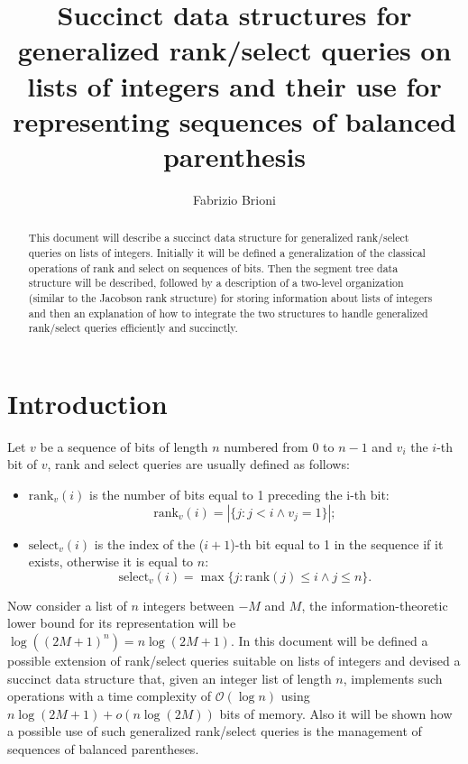 \documentclass{article}
\title{Succinct data structures for generalized rank/select queries on lists of integers and their use for representing sequences of balanced parenthesis}
\author{Fabrizio Brioni}
\begin{document}
\maketitle

\begin{abstract}
This document will describe a succinct data structure for generalized rank/select queries on lists of integers. Initially it will be defined a generalization of the classical operations of rank and select on sequences of bits. Then the segment tree data structure will be described, followed by a description of a two-level organization (similar to the Jacobson rank structure) for storing information about lists of integers and then an explanation of how to integrate the two structures to handle generalized rank/select queries efficiently and succinctly.
\end{abstract}

\section{Introduction}
Let $v$ be a sequence of bits of length $n$ numbered from $0$ to $n-1$ and $v_i$ the $i$-th bit of $v$, rank and select queries are usually defined as follows:
    \begin{itemize}
        \item $\text{rank}_v(i)$ is the number of bits equal to 1 preceding the i-th bit:
            $$\text{rank}_v(i)=|\{j : j<i \land v_j=1\}|;$$
        \item $\text{select}_v(i)$ is the index of the ($i+1$)-th bit equal to 1 in the sequence if it exists, otherwise it is equal to $n$:
            $$\text{select}_v(i)=\max\{j : \text{rank}(j) \leq i \land j \leq n\}.$$ 
    \end{itemize}
Now consider a list of $n$ integers between $-M$ and $M$, the information-theoretic lower bound for its representation will be $\log{((2M+1)^n)}=n\log{(2M+1)}$.
In this document will be defined a possible extension of rank/select queries suitable on lists of integers and devised a succinct data structure that, given an integer list of length $n$, implements such operations with a time complexity of $\mathcal{O}(\log{n})$ using $n\log{(2M+1)} + o(n\log{(2M)})$ bits of memory. Also it will be shown how a possible use of such generalized rank/select queries is the management of sequences of balanced parentheses.
\end{document}
